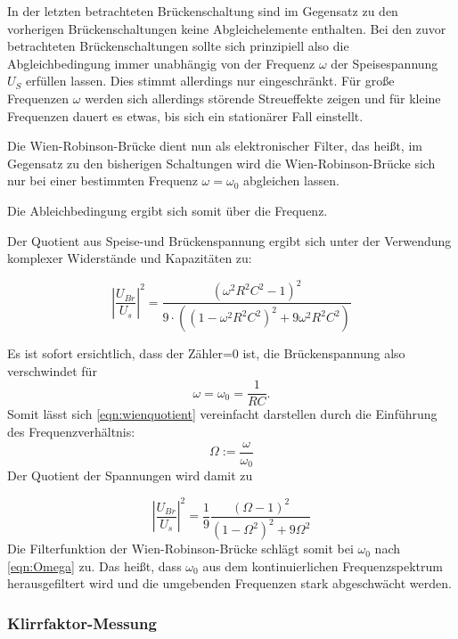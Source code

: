 In der letzten betrachteten Brückenschaltung sind im Gegensatz zu den vorherigen Brückenschaltungen keine Abgleichelemente enthalten.
Bei den zuvor betrachteten Brückenschaltungen sollte sich prinzipiell also die Abgleichbedingung immer unabhängig von der Frequenz $\omega$ der Speisespannung $U_S$ erfüllen lassen. Dies stimmt allerdings nur eingeschränkt. Für große Frequenzen $\omega$ werden sich allerdings störende Streueffekte zeigen und für kleine Frequenzen dauert es etwas, bis sich ein stationärer Fall einstellt.

Die Wien-Robinson-Brücke dient nun als elektronischer Filter, das heißt, im Gegensatz zu den bisherigen Schaltungen wird die Wien-Robinson-Brücke sich nur bei einer bestimmten Frequenz $\omega=\omega_0$ abgleichen lassen.

Die Ableichbedingung ergibt sich somit über die Frequenz.

Der Quotient aus Speise-und Brückenspannung ergibt sich unter der Verwendung komplexer Widerstände und Kapazitäten zu:

\begin{equation}
\label{eqn:wienquotient}
\left|\frac{U_{Br}}{U_s}\right|^2= \frac{(\omega^2R^2C^2-1)^2}{9 \cdot ((1-\omega^2R^2C^2)^2+9\omega^2R^2C^2)}
\end{equation}

Es ist sofort ersichtlich, dass der Zähler=0 ist, die Brückenspannung also verschwindet für
\begin{equation}
  \label{eqn:Omega}
\omega=\omega_0=\frac{1}{RC} .
\end{equation}
Somit lässt sich \eqref{eqn:wienquotient} vereinfacht darstellen durch die Einführung des Frequenzverhältnis:
\begin{equation}
\Omega:=\frac{\omega}{\omega_0}
\end{equation}
Der Quotient der Spannungen wird damit zu

\begin{equation}
\label{eqn:wienquotienteinfach}
\left|\frac{U_{Br}}{U_s}\right|^2= \frac{1}{9}\frac{(\Omega-1)^2}{(1-\Omega^2)^2+9\Omega^2}
\end{equation}
Die Filterfunktion der Wien-Robinson-Brücke schlägt somit bei $\omega_0$ nach \eqref{eqn:Omega} zu. Das heißt, dass $\omega_0$ aus dem kontinuierlichen Frequenzspektrum herausgefiltert wird und die umgebenden Frequenzen stark abgeschwächt werden.
\subsubsection{Klirrfaktor-Messung}

